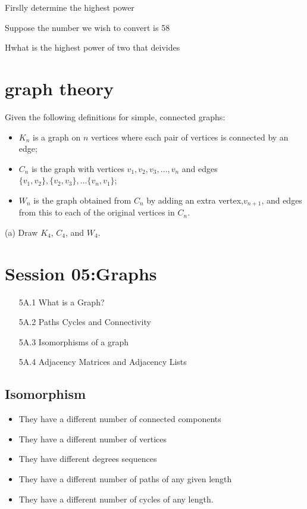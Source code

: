 \documentclass[]{report}
\begin{document}
Firslly determine the highest power

Suppose the number we wish to convert is 58

Hwhat is the highest power of two that deivides






\section{graph theory }
Given the following definitions for simple, connected graphs:
\begin{itemize}
	\item $K_n$ is a graph on $n$ vertices where each pair of vertices is connected by an edge;
	\item $C_n$ is the graph with vertices $v_1, v_2, v_3, \dots, v_n$ and edges $\{v_1,v_2\}, \{v_2,v_3\}, \dots\{v_n, v_1\}$;
	\item $W_n$ is the graph obtained from $C_n$ by adding an extra vertex,$v_{n+1}$, and edges
	from this to each of the original vertices in $C_n$.
\end{itemize}
(a) Draw $K_4$, $C_4$, and $W_4$. 
\newpage
\section*{Session 05:Graphs}
\begin{itemize}
	\item[5A.1] What is a Graph?
	\item[5A.2] Paths Cycles and Connectivity
	\item[5A.3] Isomorphisms of a graph
	\item[5A.4] Adjacency Matrices and Adjacency Lists
\end{itemize}


\subsection*{Isomorphism}
\begin{itemize}
	\item They have a different number of connected components
	\item They have a different number of vertices
	\item They have different degrees sequences
	\item They have a different number of paths of any given length
	\item They have a different number of cycles of any length.
\end{itemize}
\end{document}
